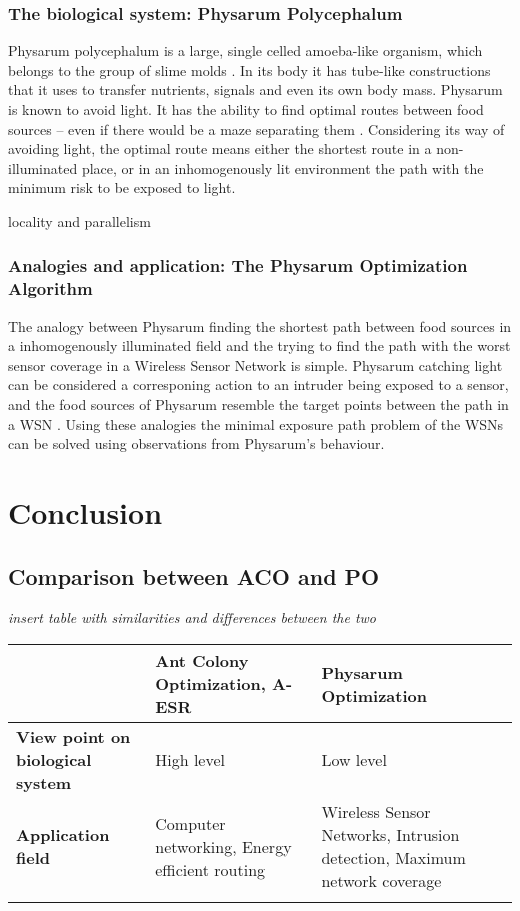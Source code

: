 \documentclass{IWORK2014}
\begin{document}
\subsubsection{The biological system: Physarum Polycephalum}
Physarum polycephalum is a large, single celled amoeba-like organism, which belongs to the group of slime molds \cite{liu2012physarum}. In its body it has tube-like constructions that it uses to transfer nutrients, signals and even its own body mass. Physarum is known to avoid light. It has the ability to find optimal routes between food sources -- even if there would be a maze separating them \cite{nakagaki2000intelligence}. Considering its way of avoiding light, the optimal route means either the shortest route in a non-illuminated place, or in an inhomogenously lit environment the path with the minimum risk to be exposed to light.


locality and parallelism
\subsubsection{Analogies and application: The Physarum Optimization Algorithm}
The analogy between Physarum finding the shortest path between food sources in a inhomogenously illuminated field and the trying to find the path with the worst sensor coverage in a Wireless Sensor Network is simple. Physarum catching light can be considered a corresponing action to an intruder being exposed to a sensor, and the food sources of Physarum resemble the target points between the path in a WSN \cite{liu2012physarum}. Using these analogies the minimal exposure path problem of the WSNs can be solved using observations from Physarum's behaviour.

\section{Conclusion}

\subsection{Comparison between ACO and PO}
\textit{insert table with similarities and differences between the two}
\begin{table}[h]
\begin{tabular}{|l|l|l|}
\hline
                                         & \textbf{Ant Colony Optimization, A-ESR}       & \textbf{Physarum Optimization}              \\ \hline
\textbf{View point on biological system} & High level                                    & Low level                                   \\ \hline
\textbf{Application field}               & Computer networking, Energy efficient routing & Wireless Sensor Networks, Intrusion detection, Maximum network coverage \\ \hline
                                         &                                               &                                             \\ \hline
\end{tabular}
\end{table}
\end{document}
